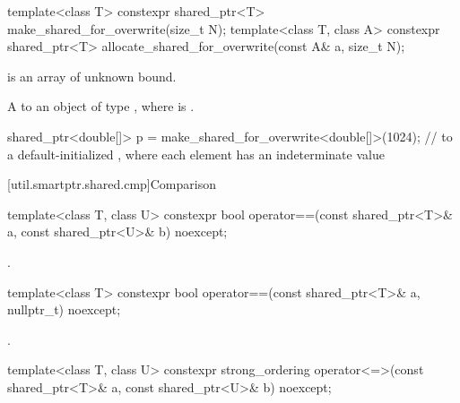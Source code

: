 %
%
\begin{itemdecl}
template<class T>
  constexpr shared_ptr<T> make_shared_for_overwrite(size_t N);
template<class T, class A>
  constexpr shared_ptr<T> allocate_shared_for_overwrite(const A& a, size_t N);
\end{itemdecl}

\begin{itemdescr}
\pnum
\constraints
{} is an array of unknown bound.

\pnum
\returns
A  to an object of type ,
where  is .

\pnum
\begin{example}
\begin{codeblock}
shared_ptr<double[]> p = make_shared_for_overwrite<double[]>(1024);
  //  to a default-initialized , where each element has an indeterminate value
\end{codeblock}
\end{example}
\end{itemdescr}

[util.smartptr.shared.cmp]{Comparison}

%
\begin{itemdecl}
template<class T, class U>
  constexpr bool operator==(const shared_ptr<T>& a, const shared_ptr<U>& b) noexcept;
\end{itemdecl}

\begin{itemdescr}
\pnum
\returns
{}.
\end{itemdescr}

%
\begin{itemdecl}
template<class T>
  constexpr bool operator==(const shared_ptr<T>& a, nullptr_t) noexcept;
\end{itemdecl}

\begin{itemdescr}
\pnum
\returns
{}.
\end{itemdescr}

%
\begin{itemdecl}
template<class T, class U>
  constexpr strong_ordering operator<=>(const shared_ptr<T>& a, const shared_ptr<U>& b) noexcept;
\end{itemdecl}

